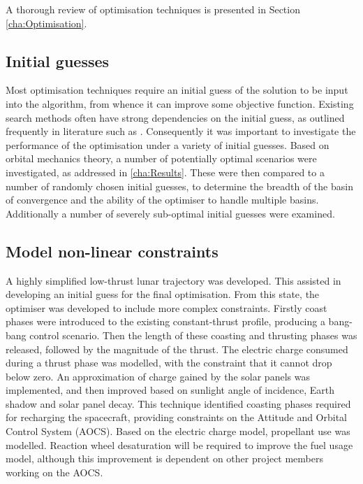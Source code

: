 A thorough review of optimisation techniques is presented in Section \ref{cha:Optimisation}.

\subsection{Initial guesses} \label{sub:Initial-guesses}

Most optimisation techniques require an initial guess of the solution to be input into the algorithm, from whence it can improve some objective function. Existing search methods often have strong dependencies on the initial guess, as outlined frequently in literature such as \textcite{Dachwald2005}. Consequently it was important to investigate the performance of the optimisation under a variety of initial guesses. Based on orbital mechanics theory, a number of potentially optimal scenarios were investigated, as addressed in \autoref{cha:Results}. These were then compared to a number of randomly chosen initial guesses, to determine the breadth of the basin of convergence and the ability of the optimiser to handle multiple basins. Additionally a number of severely sub-optimal initial guesses were examined.

\subsection{Model non-linear constraints} \label{sub:Model-non-linear-constraints}

A highly simplified low-thrust lunar trajectory was developed. This assisted in developing an initial guess for the final optimisation. From this state, the optimiser was developed to include more complex constraints. Firstly coast phases were introduced to the existing constant-thrust profile, producing a bang-bang control scenario. Then the length of these coasting and thrusting phases was released, followed by the magnitude of the thrust. The electric charge consumed during a thrust phase was modelled, with the constraint that it cannot drop below zero. An approximation of charge gained by the solar panels was implemented, and then improved based on sunlight angle of incidence, Earth shadow and solar panel decay. This technique identified coasting phases required for recharging the spacecraft, providing constraints on the Attitude and Orbital Control System (AOCS). Based on the electric charge model, propellant use was modelled. Reaction wheel desaturation will be required to improve the fuel usage model, although this improvement is dependent on other project members working on the AOCS.

